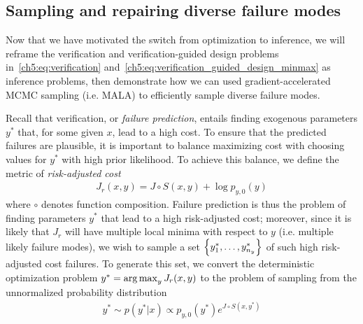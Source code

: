 \subsection{Sampling and repairing diverse failure modes}

Now that we have motivated the switch from optimization to inference, we will reframe the verification and verification-guided design problems in~\eqref{ch5:eq:verification} and~\eqref{ch5:eq:verification_guided_design_minmax} as inference problems, then demonstrate how we can used gradient-accelerated MCMC sampling (i.e. MALA) to efficiently sample diverse failure modes.

Recall that verification, or \textit{failure prediction}, entails finding exogenous parameters $y^*$ that, for some given $x$, lead to a high cost. To ensure that the predicted failures are plausible, it is important to balance maximizing cost with choosing values for $y^*$ with high prior likelihood. To achieve this balance, we define the metric of \textit{risk-adjusted cost}
\begin{align}
    J_r(x, y) = J \circ S(x, y) + \log p_{y, 0}(y)
\end{align}
where $\circ$ denotes function composition. Failure prediction is thus the problem of finding parameters $y^*$ that lead to a high risk-adjusted cost; moreover, since it is likely that $J_r$ will have multiple local minima with respect to $y$ (i.e. multiple likely failure modes), we wish to sample a set $\left\{y^*_1, \ldots, y^*_{n_y}\right\}$ of such high risk-adjusted cost failures. To generate this set, we convert the deterministic optimization problem $y^* = \operatorname*{arg\,max}_y J_r(x, y)$ to the problem of sampling from the unnormalized probability distribution
\begin{align}
    y^* \sim p(y^* | x) \propto p_{y, 0}(y^*) e^{J \circ S(x, y^*)} \label{ch6:eq:prediction_distribution}
\end{align}

